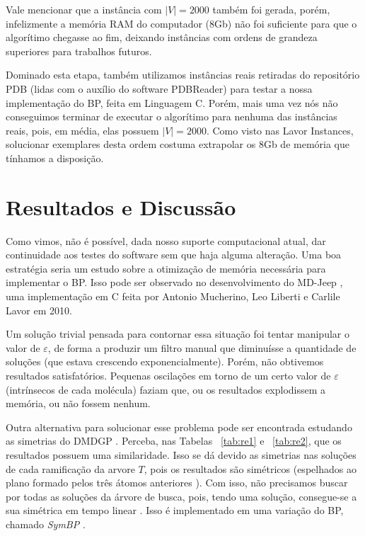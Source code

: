 \documentclass[a4paper,12pt]{article}
\begin{document}
	Vale mencionar que a instância com $|V| = 2000$ também foi gerada, porém, infelizmente a memória RAM do computador (8Gb) não foi suficiente para que o algorítimo chegasse ao fim, deixando instâncias com ordens de grandeza superiores para trabalhos futuros.
	
	Dominado esta etapa, também utilizamos instâncias reais retiradas do repositório PDB (lidas com o auxílio do software PDBReader) para testar a nossa implementação do BP, feita em Linguagem C. Porém, mais uma vez nós não conseguimos terminar de executar o algorítimo para nenhuma das instâncias reais, pois, em média, elas possuem $|V| = 2000$. Como visto nas Lavor Instances, solucionar exemplares desta ordem costuma extrapolar os 8Gb de memória que tínhamos a disposição. 
	
	\newpage
	\section{Resultados e Discussão}
	Como vimos, não é possível, dada nosso suporte computacional atual, dar continuidade aos testes do software sem que haja alguma alteração. Uma boa estratégia seria um estudo sobre a otimização de memória necessária para implementar o BP. Isso pode ser observado no desenvolvimento do MD-Jeep \cite{mucherino:BP}, uma implementação em C feita por Antonio Mucherino, Leo Liberti e Carlile Lavor em 2010.
	 
	Um solução trivial pensada para contornar essa situação foi tentar manipular o valor de $\varepsilon$, de forma a produzir um filtro manual que diminuísse a quantidade de soluções (que estava crescendo exponencialmente). Porém, não obtivemos resultados satisfatórios. Pequenas oscilações em torno de um certo valor de $\varepsilon$ (intrínsecos de cada molécula) faziam que, ou os resultados explodissem a memória, ou não fossem nenhum.
	
	Outra alternativa para solucionar esse problema pode ser encontrada estudando as simetrias do DMDGP \cite{fidalgotese} \cite{carlileGDandAplications}. Perceba, nas Tabelas ~\ref{tab:re1} e ~\ref{tab:re2}, que os resultados possuem uma similaridade. Isso se dá devido as simetrias nas soluções de cada ramificação da arvore $T$, pois os resultados são simétricos (espelhados ao plano formado pelos três átomos anteriores \cite{carlileBook31Coloquio}). Com isso, não precisamos buscar por todas as soluções da árvore de busca, pois, tendo uma solução, consegue-se a sua simétrica em tempo linear \cite{fidalgotese}. Isso é implementado em uma variação do BP, chamado \textit{SymBP} \cite{fidalgotese}.
	
\end{document}
